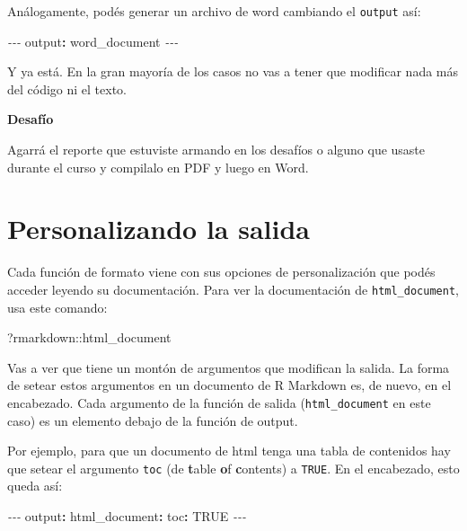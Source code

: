 \documentclass[
  openany]{book}
\newenvironment{Shaded}{\begin{snugshade}}{\end{snugshade}}
\newcommand{\AttributeTok}[1]{\textcolor[rgb]{0.77,0.63,0.00}{#1}}
\newcommand{\CharTok}[1]{\textcolor[rgb]{0.31,0.60,0.02}{#1}}
\newcommand{\FunctionTok}[1]{\textcolor[rgb]{0.00,0.00,0.00}{#1}}
\newcommand{\KeywordTok}[1]{\textcolor[rgb]{0.13,0.29,0.53}{\textbf{#1}}}
\newcommand{\NormalTok}[1]{#1}
\newcommand{\PreprocessorTok}[1]{\textcolor[rgb]{0.56,0.35,0.01}{\textit{#1}}}
\newcommand{\SpecialCharTok}[1]{\textcolor[rgb]{0.00,0.00,0.00}{#1}}
\begin{document}
Análogamente, podés generar un archivo de word cambiando el \texttt{output} así:

\begin{Shaded}
\begin{Highlighting}[]
\PreprocessorTok{{-}{-}{-}}
\FunctionTok{output}\KeywordTok{:}\AttributeTok{ word\_document}
\PreprocessorTok{{-}{-}{-}}
\end{Highlighting}
\end{Shaded}

Y ya está. En la gran mayoría de los casos no vas a tener que modificar nada más del código ni el texto.

\textbf{Desafío}

Agarrá el reporte que estuviste armando en los desafíos o alguno que usaste durante el curso y compilalo en PDF y luego en Word.

\hypertarget{personalizando-la-salida}{%
\section{Personalizando la salida}\label{personalizando-la-salida}}

Cada función de formato viene con sus opciones de personalización que podés acceder leyendo su documentación. Para ver la documentación de \texttt{html\_document}, usa este comando:

\begin{Shaded}
\begin{Highlighting}[]
\NormalTok{?rmarkdown}\SpecialCharTok{::}\NormalTok{html\_document}
\end{Highlighting}
\end{Shaded}

Vas a ver que tiene un montón de argumentos que modifican la salida. La forma de setear estos argumentos en un documento de R Markdown es, de nuevo, en el encabezado. Cada argumento de la función de salida (\texttt{html\_document} en este caso) es un elemento debajo de la función de output.

Por ejemplo, para que un documento de html tenga una tabla de contenidos hay que setear el argumento \texttt{toc} (de \textbf{t}able \textbf{o}f \textbf{c}ontents) a \texttt{TRUE}. En el encabezado, esto queda así:

\begin{Shaded}
\begin{Highlighting}[]
\PreprocessorTok{{-}{-}{-}}
\FunctionTok{output}\KeywordTok{:}\AttributeTok{ }
\AttributeTok{  }\FunctionTok{html\_document}\KeywordTok{:}
\AttributeTok{    }\FunctionTok{toc}\KeywordTok{:}\AttributeTok{ }\CharTok{TRUE}
\PreprocessorTok{{-}{-}{-}}
\end{Highlighting}
\end{Shaded}
\end{document}
